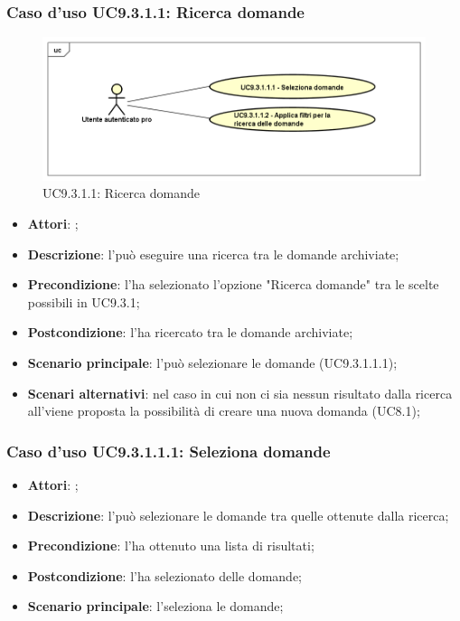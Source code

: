 		 \subsubsection{Caso d'uso UC9.3.1.1: Ricerca domande}
		 \label{UC9.3.1.1}
		 \begin{figure}[h]
		 	\centering
		 	\includegraphics[scale=0.5,keepaspectratio]{UML/UC9_3_1_1.png}
		 	\caption{UC9.3.1.1: Ricerca domande}
		 \end{figure}
		 \FloatBarrier
		 \begin{itemize}
		 	\item \textbf{Attori}: \uaupro;
		 	\item \textbf{Descrizione}: l'\uaupro può eseguire una ricerca tra le domande archiviate; 
		 	\item \textbf{Precondizione}: l'\uaupro ha selezionato l'opzione "Ricerca domande" tra le scelte possibili in UC9.3.1;
		 	\item \textbf{Postcondizione}: l'\uaupro ha ricercato tra le domande archiviate;
		 	\item \textbf{Scenario principale}: l'\uaupro può selezionare le domande (UC9.3.1.1.1); 
		 	\item \textbf{Scenari alternativi}: nel caso in cui non ci sia nessun risultato dalla ricerca all'\uaupro viene proposta la possibilità di creare una nuova domanda (UC8.1);
		 \end{itemize}
		 
		 \subsubsection{Caso d'uso UC9.3.1.1.1: Seleziona domande}
		 \label{UC9.3.1.1.1}
		 \begin{itemize}
		 	\item \textbf{Attori}: \uaupro;
		 	\item \textbf{Descrizione}: l'\uaupro può selezionare le domande tra quelle ottenute dalla ricerca;
		 	\item \textbf{Precondizione}: l'\uaupro ha ottenuto una lista di risultati;
		 	\item \textbf{Postcondizione}: l'\uaupro ha selezionato delle domande; 
		 	\item \textbf{Scenario principale}: l'\uaupro seleziona le domande;
		 \end{itemize}
		 

